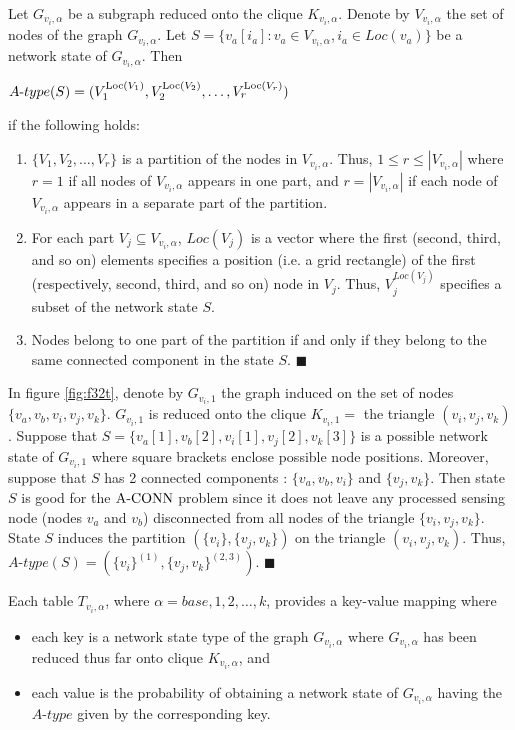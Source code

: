 \begin{definition}
Let $G_{v_i,\alpha}$ be a subgraph reduced onto the clique $K_{v_i,\alpha}$. Denote by $V_{v_i,\alpha}$ the set of nodes of the graph $G_{v_i,\alpha}$. Let $S=\{v_a[i_a] :v_a\in V_{v_i,\alpha}, i_a \in Loc(v_a)\}$ be a network state of $G_{v_i,\alpha}$. Then\\
\centerline{
$A\mbox{-}type(S)=(V_1^{{\mathrm {Loc}}(V_1)}, V_2^{{\mathrm {Loc}}(V_2)}, \ldots, V_r^{{\mathrm {Loc}}(V_r)})$}

if the following holds:
\begin{enumerate}
\item $\{V_1, V_2, \ldots, V_r \}$ is a partition of the nodes in $V_{v_i,\alpha}$. Thus, $1\leq r\leq|V_{v_i,\alpha}|$ where $r=1$ if all nodes of $V_{v_i,\alpha}$ appears in one part, and $r=|V_{v_i,\alpha}|$ if each node of $V_{v_i,\alpha}$ appears in a separate part of the partition.
\item For each part $V_j\subseteq V_{v_i,\alpha}$, $Loc(V_j)$ is a vector where the first (second, third, and so on) elements specifies a position (i.e. a grid rectangle) of the first (respectively, second, third, and so on) node in $V_j$. Thus, $V_j^{Loc(V_j)}$ specifies a subset of the network state $S$.
\item Nodes belong to one part of the partition if and only if they belong to the same connected component in the state $S$. $\blacksquare$
\end{enumerate}
\end{definition}
\begin{example}
\normalfont
In figure \ref{fig:f32t}, denote by $G_{v_i,1}$ the graph induced on the set of nodes $\{v_a, v_b, v_i, v_j,v_k\}$. $G_{v_i,1}$ is reduced onto the clique $K_{v_i,1}=$ the triangle $(v_i,v_j,v_k)$. Suppose that $S=\{v_a[1], v_b[2], v_i[1], v_j[2], v_k[3]\}$ is a possible network state of $G_{v_i,1}$ where square brackets enclose possible node positions. Moreover, suppose that $S$ has 2 connected components : $\{v_a, v_b, v_i\}$ and $\{v_j, v_k\}$. Then state $S$ is good for the ${\mathrm {A\mbox{-}CONN}}$ problem since it does not leave any processed sensing node (nodes $v_a$ and $v_b$) disconnected from all nodes of the triangle $\{v_i, v_j, v_k\}$. State $S$ induces the partition $(\{v_i\}, \{v_j,v_k\})$ on the triangle $(v_i,v_j,v_k)$. Thus, $A\mbox{-}type(S)=(\{v_i\}^{(1)}, \{v_j,v_k\}^{(2,3)})$. $\blacksquare$
\end{example}


Each table $T_{v_i,\alpha}$, where $\alpha=base, 1, 2, \ldots, k$, provides a key-value mapping where
\begin{itemize}[noitemsep]
\item each key is a network state type of the graph $G_{v_i,\alpha}$ where $G_{v_i,\alpha}$ has been reduced thus far onto clique $K_{v_i,\alpha}$, and
\item each value is the probability of obtaining a network state of $G_{v_i,\alpha}$ having the $A\mbox{-}type$ given by the corresponding key.
\end{itemize}

